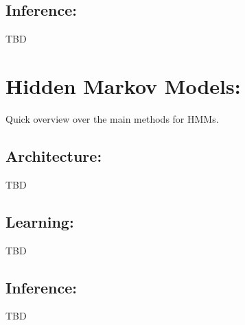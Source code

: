 \documentclass[a4paper,11pt]{report}
\begin{document}
{    \subsection{Inference:}
      \label{subseq:PGMs/BN/Inference}
      TBD
      
  \section{Hidden Markov Models:}
    \label{seq:PGMs/HMM}
    Quick overview over the main methods for HMMs.
    
    \subsection{Architecture:}
      \label{subseq:PGMs/HMM/Architecture}
      TBD

    \subsection{Learning:}
      \label{subseq:PGMs/HMM/Learning}
      TBD

    \subsection{Inference:}
      \label{subseq:PGMs/HMM/Inference}
      TBD
      
% 	
% 
% 
%       
%   
%     

}
\end{document}

